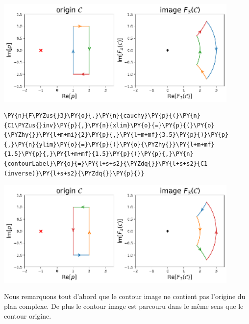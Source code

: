 \begin{center}
    \includegraphics[width=0.9\textwidth]{notebook/fig/output_32_1.eps}
\end{center}
\begin{tcolorbox}[breakable, size=fbox, boxrule=1pt, pad at break*=1mm,colback=cellbackground, colframe=cellborder]
\begin{Verbatim}[commandchars=\\\{\}]
\PY{n}{F\PYZus{}3}\PY{o}{.}\PY{n}{cauchy}\PY{p}{(}\PY{n}{C1\PYZus{}inv}\PY{p}{,}\PY{n}{xlim}\PY{o}{=}\PY{p}{(}\PY{o}{\PYZhy{}}\PY{l+m+mi}{2}\PY{p}{,}\PY{l+m+mf}{3.5}\PY{p}{)}\PY{p}{,}\PY{n}{ylim}\PY{o}{=}\PY{p}{(}\PY{o}{\PYZhy{}}\PY{l+m+mf}{1.5}\PY{p}{,}\PY{l+m+mf}{1.5}\PY{p}{)}\PY{p}{,}\PY{n}{contourLabel}\PY{o}{=}\PY{l+s+s2}{\PYZdq{}}\PY{l+s+s2}{C1 (inverse)}\PY{l+s+s2}{\PYZdq{}}\PY{p}{)}
\end{Verbatim}
\end{tcolorbox}
\begin{center}
    \includegraphics[width=0.9\textwidth]{notebook/fig/output_33_1.eps}
\end{center}
Nous remarquons tout d'abord que le contour image ne contient pas
l'origine du plan complexe. De plus le contour image est parcouru dans
le même sens que le contour origine. 
